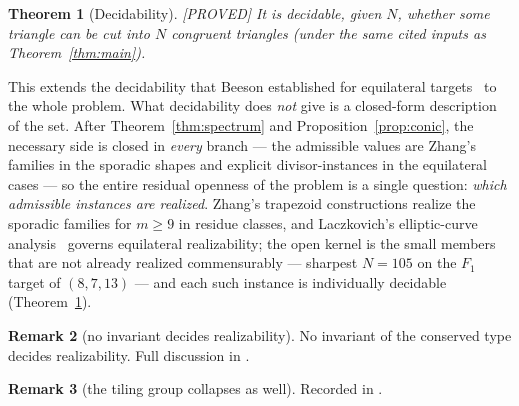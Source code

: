 \documentclass[11pt,reqno]{amsart}
\theoremstyle{plain}
\newtheorem{theorem}{Theorem}
\theoremstyle{definition}
\newtheorem{remark}[theorem]{Remark}
\newcommand{\lab}[1]{\hfill\textnormal{\footnotesize\textsc{[#1]}}}
\begin{document}
\begin{theorem}[Decidability]\label{thm:decidable}\lab{PROVED}
It is decidable, given $N$, whether some triangle can be cut into $N$ congruent triangles
(under the same cited inputs as Theorem~\ref{thm:main}).
\end{theorem}

\noindent This extends the decidability that Beeson established for equilateral
targets~\cite[Thm.~4]{BeesonEq} to the whole problem. What decidability does \emph{not} give is
a closed-form description of the set. After Theorem~\ref{thm:spectrum} and
Proposition~\ref{prop:conic}, the necessary side is closed in \emph{every} branch --- the
admissible values are Zhang's families in the sporadic shapes and explicit divisor-instances in
the equilateral cases --- so the entire residual openness of the problem is a single question:
\emph{which admissible instances are realized}. Zhang's trapezoid constructions realize the
sporadic families for $m\ge9$ in residue classes, and Laczkovich's elliptic-curve
analysis~\cite{LaczkovichEll} governs equilateral realizability; the open kernel is the small
members that are not already realized commensurably --- sharpest $N=105$ on the $F_1$ target of
$(8,7,13)$ --- and each such instance is individually decidable (Theorem~\ref{thm:decidable}).

\begin{remark}[no invariant decides realizability]\label{rem:conserved}
No invariant of the conserved type decides realizability. Full discussion in \cite{Obstructions}.
\end{remark}

\begin{remark}[the tiling group collapses as well]\label{rem:tilinggroup}
Recorded in \cite{Obstructions}.
\end{remark}
\end{document}
